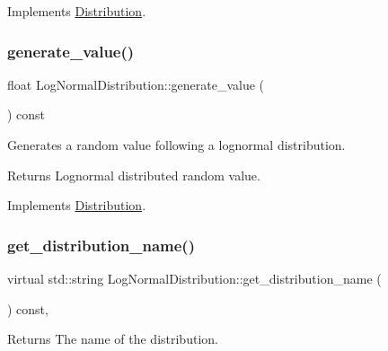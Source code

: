 Implements \hyperlink{classDistribution_a0778c93fb686dd1abe2830e1c7e564a6}{Distribution}.

\mbox{\label{classLogNormalDistribution_a02ed860dc4f556df25e9274cd106937c}} 
\subsubsection{\texorpdfstring{generate\+\_\+value()}{generate\_value()}}
{\footnotesize\ttfamily float Log\+Normal\+Distribution\+::generate\+\_\+value (\begin{DoxyParamCaption}{ }\end{DoxyParamCaption}) const\hspace{0.3cm}{\ttfamily [virtual]}}

Generates a random value following a lognormal distribution. \begin{DoxyReturn}{Returns}
Lognormal distributed random value. 
\end{DoxyReturn}


Implements \hyperlink{classDistribution_aa1ea89994ac123f003b8b8f5fe6fad40}{Distribution}.

\mbox{\label{classLogNormalDistribution_a05e474accd65f523749011fbc8b42b65}} 
\subsubsection{\texorpdfstring{get\+\_\+distribution\+\_\+name()}{get\_distribution\_name()}}
{\footnotesize\ttfamily virtual std\+::string Log\+Normal\+Distribution\+::get\+\_\+distribution\+\_\+name (\begin{DoxyParamCaption}{ }\end{DoxyParamCaption}) const\hspace{0.3cm}{\ttfamily [inline]}, {\ttfamily [virtual]}}

\begin{DoxyReturn}{Returns}
The name of the distribution. 
\end{DoxyReturn}


